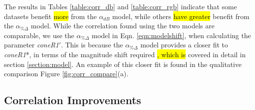 

The results in Tables \ref{table:corr_db} and \ref{table:corr_rgb} indicate that some datasets benefit \hl{more} from the $\alpha_{dB}$ model, while others \hl{have greater} benefit from the $\alpha_{\%\Delta}$ model. While the correlation found using the two models are comparable, we use the $\alpha_{\%\Delta}$ model in Eqn. \ref{eqn:modelshift}, when calculating the parameter \textit{coneR1}$'$. This is because the $\alpha_{\%\Delta}$ model provides a closer fit to \textit{coneR1}*, in terms of the magnitude shift required \hl{, which is }covered in detail in section \ref{section:model}. An example of this closer fit is found in the qualitative comparison Figure \ref{fig:corr_compare}(a).

\subsection{Correlation Improvements}

